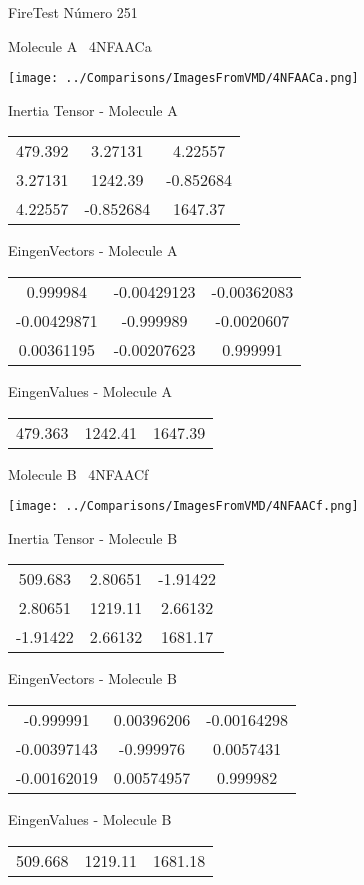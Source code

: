 \vtab[-3cm]
\begin{center}
{\large FireTest \tab Número 251}
\end{center}
\begin{multicols}{2}
\begin{center}

Molecule A \
4NFAACa

\texttt{[image: ../Comparisons/ImagesFromVMD/4NFAACa.png]}

Inertia Tensor - Molecule A \\
\begin{tabular}{|c c c|}
479.392	 & 	3.27131	 & 	4.22557	 \\
3.27131	 & 	1242.39	 & 	-0.852684	 \\
4.22557	 & 	-0.852684	 & 	1647.37
\end{tabular}

\vtab
 EingenVectors - Molecule A     \\
\begin{tabular}{|c c c|}
0.999984	 & 	-0.00429123	 & 	-0.00362083	 \\
-0.00429871	 & 	-0.999989	 & 	-0.0020607	 \\
0.00361195	 & 	-0.00207623	 & 	0.999991
\end{tabular}

\vtab
 EingenValues - Molecule A     \\
\begin{tabular}{|c c c|}
479.363	 & 	1242.41	 & 	1647.39	 \\
\end{tabular}
\columnbreak

Molecule B \
4NFAACf

\texttt{[image: ../Comparisons/ImagesFromVMD/4NFAACf.png]}

Inertia Tensor - Molecule B \\
\begin{tabular}{|c c c|}
509.683	 & 	2.80651	 & 	-1.91422	 \\
2.80651	 & 	1219.11	 & 	2.66132	 \\
-1.91422	 & 	2.66132	 & 	1681.17
\end{tabular}

\vtab
 EingenVectors - Molecule B     \\
\begin{tabular}{|c c c|}
-0.999991	 & 	0.00396206	 & 	-0.00164298	 \\
-0.00397143	 & 	-0.999976	 & 	0.0057431	 \\
-0.00162019	 & 	0.00574957	 & 	0.999982
\end{tabular}

\vtab
 EingenValues - Molecule B     \\
\begin{tabular}{|c c c|}
509.668	 & 	1219.11	 & 	1681.18	 \\
\end{tabular}

\end{center}
\end{multicols}

